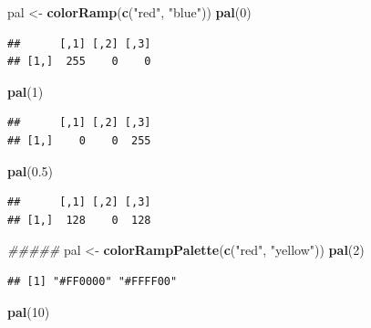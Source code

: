 \documentclass[
]{book}
\newenvironment{Shaded}{\begin{snugshade}}{\end{snugshade}}
\newcommand{\CommentTok}[1]{\textcolor[rgb]{0.56,0.35,0.01}{\textit{#1}}}
\newcommand{\DecValTok}[1]{\textcolor[rgb]{0.00,0.00,0.81}{#1}}
\newcommand{\FloatTok}[1]{\textcolor[rgb]{0.00,0.00,0.81}{#1}}
\newcommand{\KeywordTok}[1]{\textcolor[rgb]{0.13,0.29,0.53}{\textbf{#1}}}
\newcommand{\NormalTok}[1]{#1}
\newcommand{\StringTok}[1]{\textcolor[rgb]{0.31,0.60,0.02}{#1}}
\begin{document}
\begin{Shaded}
\begin{Highlighting}[]
\NormalTok{pal <-}\StringTok{ }\KeywordTok{colorRamp}\NormalTok{(}\KeywordTok{c}\NormalTok{(}\StringTok{"red"}\NormalTok{, }\StringTok{"blue"}\NormalTok{))}
\KeywordTok{pal}\NormalTok{(}\DecValTok{0}\NormalTok{)}
\end{Highlighting}
\end{Shaded}

\begin{verbatim}
##      [,1] [,2] [,3]
## [1,]  255    0    0
\end{verbatim}

\begin{Shaded}
\begin{Highlighting}[]
\KeywordTok{pal}\NormalTok{(}\DecValTok{1}\NormalTok{)}
\end{Highlighting}
\end{Shaded}

\begin{verbatim}
##      [,1] [,2] [,3]
## [1,]    0    0  255
\end{verbatim}

\begin{Shaded}
\begin{Highlighting}[]
\KeywordTok{pal}\NormalTok{(}\FloatTok{0.5}\NormalTok{)}
\end{Highlighting}
\end{Shaded}

\begin{verbatim}
##      [,1] [,2] [,3]
## [1,]  128    0  128
\end{verbatim}

\begin{Shaded}
\begin{Highlighting}[]
\CommentTok{#####}
\NormalTok{pal <-}\StringTok{ }\KeywordTok{colorRampPalette}\NormalTok{(}\KeywordTok{c}\NormalTok{(}\StringTok{"red"}\NormalTok{, }\StringTok{"yellow"}\NormalTok{))}
\KeywordTok{pal}\NormalTok{(}\DecValTok{2}\NormalTok{)}
\end{Highlighting}
\end{Shaded}

\begin{verbatim}
## [1] "#FF0000" "#FFFF00"
\end{verbatim}

\begin{Shaded}
\begin{Highlighting}[]
\KeywordTok{pal}\NormalTok{(}\DecValTok{10}\NormalTok{)}
\end{Highlighting}
\end{Shaded}
\end{document}

